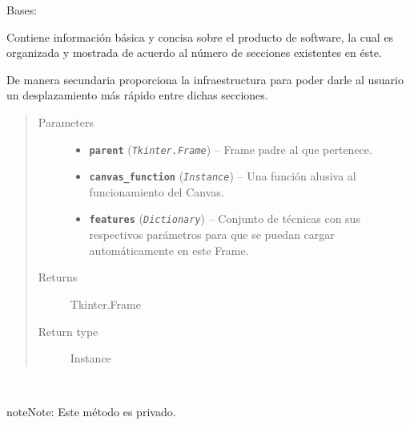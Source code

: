 \documentclass[letterpaper,10pt,english]{sphinxmanual}
\begin{document}
\begin{fulllineitems}
\label{View/Main/Home/IntroductionFrame:View.Main.Home.IntroductionFrame.IntroductionFrame}
Bases: 

\begin{DUlineblock}{0em}
\item[] Contiene información básica y concisa sobre el producto de software,
la cual es organizada y mostrada de acuerdo al número de secciones existentes
en éste.
\item[] De manera secundaria proporciona la infraestructura para poder darle al usuario
un desplazamiento más rápido entre dichas secciones.
\end{DUlineblock}
\begin{quote}\begin{description}
\item[{Parameters}] \leavevmode\begin{itemize}
\item {} 
\textbf{\texttt{parent}} (\emph{\texttt{Tkinter.Frame}}) -- Frame padre al que pertenece.

\item {} 
\textbf{\texttt{canvas\_function}} (\emph{\texttt{Instance}}) -- Una función alusiva al funcionamiento del Canvas.

\item {} 
\textbf{\texttt{features}} (\emph{\texttt{Dictionary}}) -- Conjunto de técnicas con sus respectivos parámetros para que
se puedan cargar automáticamente en este Frame.

\end{itemize}

\item[{Returns}] \leavevmode
Tkinter.Frame

\item[{Return type}] \leavevmode
Instance

\end{description}\end{quote}

\begin{fulllineitems}
\label{View/Main/Home/IntroductionFrame:View.Main.Home.IntroductionFrame.IntroductionFrame._IntroductionFrame__go_to_selected_section}~
\begin{notice}{note}{Note:}
Este método es privado.
\end{notice}


\end{fulllineitems}
\end{fulllineitems}
\end{document}
